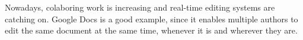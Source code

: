 Nowadays, colaboring work is increasing and real-time editing systems are catching on. Google Docs is a good example, since it enables multiple authors to edit the same document at the same time, whenever it is and wherever they are.